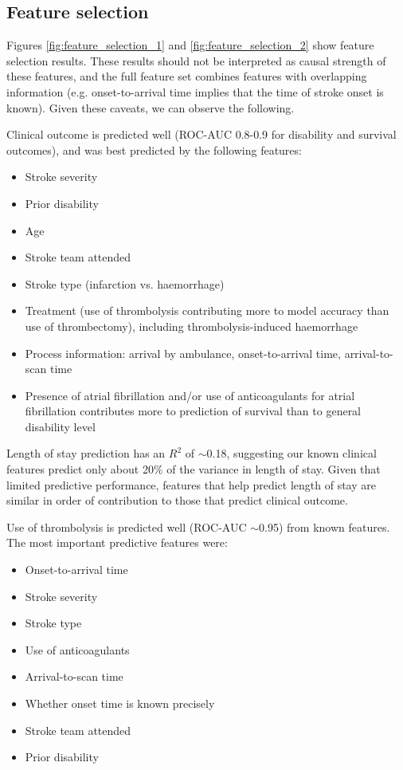 \subsection{Feature selection}

Figures \ref{fig:feature_selection_1} and \ref{fig:feature_selection_2} show feature selection results. These results should not be interpreted as causal strength of these features, and the full feature set combines features with overlapping information (e.g. onset-to-arrival time implies that the time of stroke onset is known). Given these caveats, we can observe the following.

Clinical outcome is predicted well (ROC-AUC 0.8-0.9 for disability and survival outcomes), and was best predicted by the following features:

\begin{itemize}
    \item Stroke severity
    \item Prior disability
    \item Age
    \item Stroke team attended
    \item Stroke type (infarction vs. haemorrhage)
    \item Treatment (use of thrombolysis contributing more to model accuracy than use of thrombectomy), including thrombolysis-induced haemorrhage
    \item Process information: arrival by ambulance, onset-to-arrival time, arrival-to-scan time
    \item Presence of atrial fibrillation and/or use of anticoagulants for atrial fibrillation contributes more to prediction of survival than to general disability level
\end{itemize}

Length of stay prediction has an $R^2$ of $\sim$0.18, suggesting our known clinical features predict only about 20\% of the variance in length of stay. Given that limited predictive performance, features that help predict length of stay are similar in order of contribution to those that predict clinical outcome.

Use of thrombolysis is predicted well (ROC-AUC $\sim$0.95) from known features. The most important predictive features were:

\begin{itemize}
    \item Onset-to-arrival time
    \item Stroke severity
    \item Stroke type
    \item Use of anticoagulants
    \item Arrival-to-scan time
    \item Whether onset time is known precisely
    \item Stroke team attended
    \item Prior disability    
\end{itemize}

